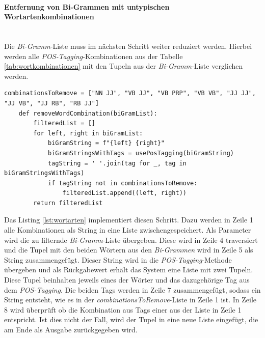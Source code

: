 \paragraph{Entfernung von Bi-Grammen mit untypischen Wortartenkombinationen}\mbox{}\\
Die \emph{Bi-Gramm}-Liste muss im nächsten Schritt weiter reduziert werden. Hierbei werden alle \emph{POS-Tagging}-Kombinationen aus der Tabelle \ref{tab:wortkombinationen} mit den Tupeln aus der \emph{Bi-Gramm}-Liste verglichen werden.
\begin{lstlisting}[caption={Implementation der Filterung von Wortartenkombinationen}, label=lst:wortarten]
	combinationsToRemove = ["NN JJ", "VB JJ", "VB PRP", "VB VB", "JJ JJ", "JJ VB", "JJ RB", "RB JJ"]
	def removeWordCombination(biGramList):
		filteredList = []
		for left, right in biGramList:
			biGramString = f"{left} {right}"
			biGramStringsWithTags = usePosTagging(biGramString)
			tagString = ' '.join(tag for _, tag in biGramStringsWithTags)
			if tagString not in combinationsToRemove:
				filteredList.append((left, right))
		return filteredList
\end{lstlisting}
Das Listing \ref{lst:wortarten} implementiert diesen Schritt. Dazu werden in Zeile 1 alle Kombinationen als String in eine Liste zwischengespeichert. Als Parameter wird die zu filternde \emph{Bi-Gramm}-Liste übergeben. Diese wird in Zeile 4 traversiert und die Tupel mit den beiden Wörtern aus den \emph{Bi-Grammen} wird in Zeile 5 als String zusammengefügt. Dieser String wird in die \emph{POS-Tagging}-Methode übergeben und als Rückgabewert erhält das System eine Liste mit zwei Tupeln. Diese Tupel beinhalten jeweils eines der Wörter und das dazugehörige Tag aus dem \emph{POS-Tagging}. Die beiden Tags werden in Zeile 7 zusammengefügt, sodass ein String entsteht, wie es in der \emph{combinationsToRemove}-Liste in Zeile 1 ist. In Zeile 8 wird überprüft ob die Kombination aus Tags einer aus der Liste in Zeile 1 entspricht. Ist dies nicht der Fall, wird der Tupel in eine neue Liste eingefügt, die am Ende als Ausgabe zurückgegeben wird.

